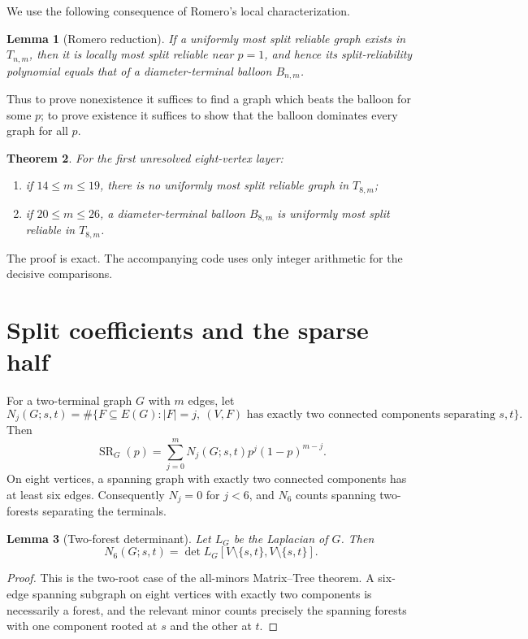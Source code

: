 \documentclass[11pt]{article}
\newtheorem{theorem}{Theorem}
\newtheorem{lemma}[theorem]{Lemma}
\newcommand{\SR}{\operatorname{SR}}
\begin{document}
We use the following consequence of Romero's local characterization.

\begin{lemma}[Romero reduction]\label{lem:romero}
If a uniformly most split reliable graph exists in $T_{n,m}$, then it is locally most split reliable near $p=1$, and hence its split-reliability polynomial equals that of a diameter-terminal balloon $B_{n,m}$.
\end{lemma}

Thus to prove nonexistence it suffices to find a graph which beats the balloon for some $p$; to prove existence it suffices to show that the balloon dominates every graph for all $p$.

\begin{theorem}\label{thm:main}
For the first unresolved eight-vertex layer:
\begin{enumerate}
\item if $14\le m\le19$, there is no uniformly most split reliable graph in $T_{8,m}$;
\item if $20\le m\le26$, a diameter-terminal balloon $B_{8,m}$ is uniformly most split reliable in $T_{8,m}$.
\end{enumerate}
\end{theorem}

The proof is exact. The accompanying code uses only integer arithmetic for the decisive comparisons.

\section{Split coefficients and the sparse half}
For a two-terminal graph $G$ with $m$ edges, let
\[
 N_j(G;s,t)
 =\#\{F\subseteq E(G): |F|=j,\ (V,F)\text{ has exactly two connected components separating }s,t\}.
\]
Then
\begin{equation}\label{eq:bernstein}
 \SR_G(p)=\sum_{j=0}^m N_j(G;s,t)p^j(1-p)^{m-j}.
\end{equation}
On eight vertices, a spanning graph with exactly two connected components has at least six edges. Consequently $N_j=0$ for $j<6$, and $N_6$ counts spanning two-forests separating the terminals.

\begin{lemma}[Two-forest determinant]\label{lem:matrix-tree}
Let $L_G$ be the Laplacian of $G$. Then
\[
 N_6(G;s,t)=\det L_G[V\setminus\{s,t\},V\setminus\{s,t\}].
\]
\end{lemma}
\begin{proof}
This is the two-root case of the all-minors Matrix--Tree theorem. A six-edge spanning subgraph on eight vertices with exactly two components is necessarily a forest, and the relevant minor counts precisely the spanning forests with one component rooted at $s$ and the other at $t$.
\end{proof}
\end{document}
